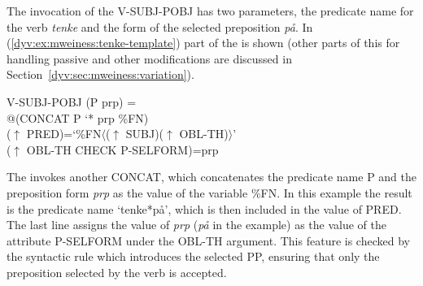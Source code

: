 \documentclass[output=paper]{langsci/langscibook}
\begin{document}
The invocation of the  V-SUBJ-POBJ has two parameters, the predicate name for the verb \textit{tenke} and the form of the selected preposition \textit{på}.
In (\ref{dyv:ex:mweiness:tenke-template}) part of the  is shown (other parts of this  for handling passive and other modifications are discussed in Section~\ref{dyv:sec:mweiness:variation}).

\ea\label{dyv:ex:mweiness:tenke-template}
{\small 
V-SUBJ-POBJ (P prp) =\\
\hspace{2em} @(CONCAT P `* prp \%FN)\\
\hspace{2em}  ($\uparrow$ PRED)=`\%FN$\langle$($\uparrow$ SUBJ)($\uparrow$ OBL-TH)$\rangle$'\\
\hspace{2em}  ($\uparrow$ OBL-TH CHECK P-SELFORM)=prp
}
\z

The  invokes another  CONCAT, which concatenates the predicate name P and the preposition form \emph{prp} as the value of the variable \%FN.
In this example the result is the predicate name `tenke*på', which is then included in the value of PRED.
The last line assigns the value of \emph{prp} (\textit{på} in the example) as the value of the attribute P-SELFORM under the OBL-TH argument.
This feature is checked by the syntactic rule which introduces the selected PP, ensuring that only the preposition selected by the verb is accepted.



\end{document}
